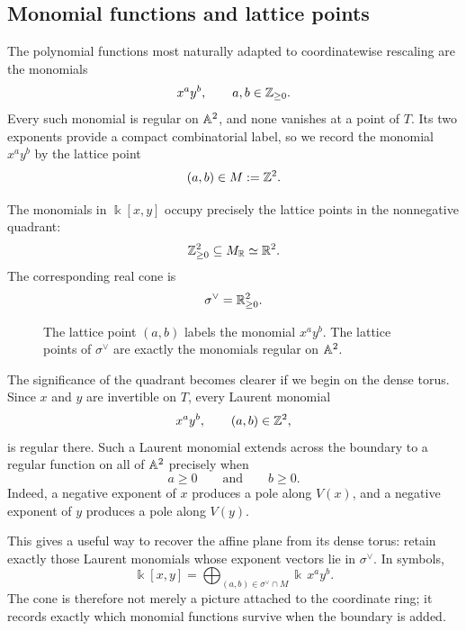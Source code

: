 \subsection{Monomial functions and lattice points}

The polynomial functions most naturally adapted to coordinatewise
rescaling are the monomials
\[
x^a y^b,
\qquad
a,b\in\mathbb{Z}_{\geq0}.
\]
Every such monomial is regular on \(\mathbb{A}^2\), and none vanishes at a
point of \(T\). Its two exponents provide a compact combinatorial
label, so we record the monomial \(x^ay^b\) by the lattice point
\[
(a,b)\in M:=\mathbb{Z}^2.
\]

The monomials in \(\Bbbk[x,y]\) occupy precisely the lattice points in
the nonnegative quadrant:
\[
\mathbb{Z}_{\geq0}^2\subseteq M_{\mathbb{R}}\simeq\mathbb{R}^2.
\]
The corresponding real cone is
\[
\sigma^\vee=\mathbb{R}_{\geq0}^2.
\]

\begin{figure}[ht]
\centering
{}
\caption{The lattice point \((a,b)\) labels the monomial \(x^ay^b\).
The lattice points of \(\sigma^\vee\) are exactly the monomials regular
on \(\mathbb{A}^2\).}
\label{fig:a2-monomials-cone}
\end{figure}

The significance of the quadrant becomes clearer if we begin on the
dense torus. Since \(x\) and \(y\) are invertible on \(T\), every
Laurent monomial
\[
x^a y^b,
\qquad
(a,b)\in\mathbb{Z}^2,
\]
is regular there. Such a Laurent monomial extends across the boundary
to a regular function on all of \(\mathbb{A}^2\) precisely when
\[
a\geq0
\qquad\text{and}\qquad
b\geq0.
\]
Indeed, a negative exponent of \(x\) produces a pole along \(V(x)\),
and a negative exponent of \(y\) produces a pole along \(V(y)\).

This gives a useful way to recover the affine plane from its dense
torus: retain exactly those Laurent monomials whose exponent vectors
lie in \(\sigma^\vee\). In symbols,
\[
\Bbbk[x,y]
=
\bigoplus_{(a,b)\in\sigma^\vee\cap M}
\Bbbk\,x^ay^b.
\]
The cone is therefore not merely a picture attached to the coordinate
ring; it records exactly which monomial functions survive when the
boundary is added.

